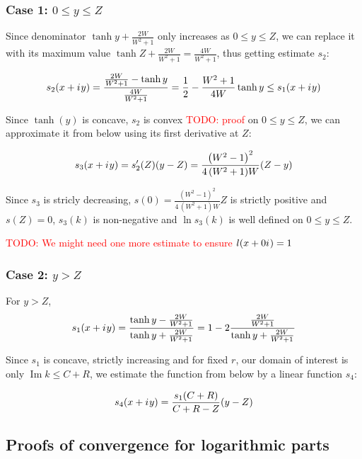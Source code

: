 \documentclass[12pt, a4paper]{article}
\newcommand{\iu}{{i\mkern1mu}}
\renewcommand{\Im}{\operatorname{Im}}
\newcommand{\todo}[1]{{\large \textcolor{red}{TODO: #1}}}
\begin{document}
\subsubsection*{Case 1: $0 \le y \le Z$}
Since denominator $\tanh y + \frac{2 W}{W^2 + 1}$ only increases as $0 \le y \le Z$, we can replace it with its maximum value $\tanh Z + \frac{2 W}{W^2 + 1} = \frac{4 W}{W^2 + 1}$, thus getting estimate $s_2$:

\[
s_2(x + \iu y) = \frac{\frac{2 W}{W^2 + 1} - \tanh y}{\frac{4 W}{W^2 + 1}} = \frac{1}{2} - \frac{W^2 + 1}{4 W} \tanh y \le s_1(x + \iu y)
\]

Since $\tanh(y)$ is concave, $s_2$ is convex \todo{proof} on $0 \le y \le Z$, we can approximate it from below using its first derivative at $Z$:

\[
s_3(x + \iu y) = s_2'(Z)(y - Z) = \frac{{\left(W^{2} - 1\right)}^{2}}{4 \, {\left(W^{2} + 1\right)} W} (Z - y)
\]

Since $s_3$ is stricly decreasing, $s(0) = \frac{{\left(W^{2} - 1\right)}^{2}}{4 \, {\left(W^{2} + 1\right)} W} Z$ is strictly positive and $s(Z) = 0$, $s_3(k)$ is non-negative and $\ln s_3(k)$ is well defined on $0 \le y \le Z$.

\todo{We might need one more estimate to ensure $l(x + 0 \iu) = 1$}


\subsubsection*{Case 2: $y > Z$}
For $y > Z$, 
\[
s_1(x + \iu y) 
 = \frac{\tanh y - \frac{2 W}{W^2 + 1}}{\tanh y + \frac{2 W}{W^2 + 1}}
 = 1 - 2 \frac{\frac{2 W}{W^2 + 1}}{\tanh y + \frac{2 W}{W^2 + 1}}
\]

Since $s_1$ is concave, strictly increasing and for fixed $r$, our domain of interest is only $\Im k \le C + R$, we estimate the function from below by a linear function $s_4$:

\[
s_4(x + \iu y) = 
\frac{s_1(C + R)}{C + R - Z} (y - Z)
\]

\subsection*{Proofs of convergence for logarithmic parts}
\end{document}
